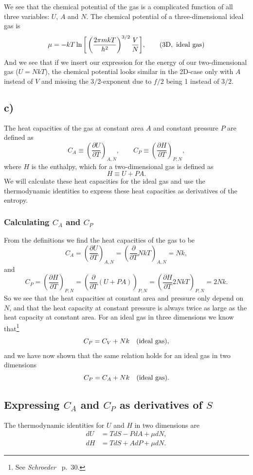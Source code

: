 \documentclass[a4paper, 11pt, titlepage, english]{article}
\begin{document}
We see that the chemical potential of the gas is a complicated function of all three variables: $U$, $A$ and $N$. The chemical potential of a three-dimensional ideal gas is
$$\mu = -kT \ln \bigg[\left(\frac{2\pi mkT}{h^2}\right)^{3/2}\frac{V}{N}\bigg], \qquad {\rm (3D,\ ideal\ gas)}$$
And we see that if we insert our expression for the energy of our two-dimensional gas ($U=NkT$), the chemical potential looks similar in the 2D-case only with $A$ instead of $V$ and missing the $3/2$-exponent due to $f/2$ being 1 instead of $3/2$.

\clearpage

\subsection*{c)}
The heat capacities of the gas at constant area $A$ and constant pressure $P$ are defined as
$$C_A \equiv \left( \frac{\partial U}{\partial T}\right)_{A,N}, \qquad C_P \equiv \left(\frac{\partial H}{\partial T}\right)_{P,N},$$
where $H$ is the enthalpy, which for a two-dimensional gas is defined as
$$H \equiv U + PA.$$
We will calculate these heat capacities for the ideal gas and use the thermodynamic identities to express these heat capacities as derivatives of the entropy.


\subsubsection*{Calculating $C_A$ and $C_P$}
From the definitions we find the heat capacities of the gas to be
$$C_A = \left( \frac{\partial U}{\partial T}\right)_{A,N} = \left( \frac{\partial }{\partial T} NkT\right)_{A,N} = Nk,$$
and
$$C_P = \left( \frac{\partial H}{\partial T} \right)_{P,N} = \left( \frac{\partial }{\partial T} (U + PA) \right)_{P,N} = \left( \frac{\partial H}{\partial T} 2NkT \right)_{P,N}  = 2Nk.$$
So we see that the heat capacities at constant area and pressure only depend on $N$, and that the heat capacity at constant pressure is always twice as large as the heat capacity at constant area.
For an ideal gas in three dimensions we know that\footnote{See {\it Schroeder\ } p.\ 30.}
$$C_P = C_V + Nk \quad {(\rm ideal\ gas)},$$
and we have now shown that the same relation holds for an ideal gas in two dimensions
$$C_P = C_A + Nk \quad {(\rm ideal\ gas)}.$$

\subsection*{Expressing $C_A$ and $C_P$ as derivatives of $S$}
The thermodynamic identities for $U$ and $H$ in two dimensions are
\begin{align}
dU &= TdS - PdA + \mu dN,\\
dH &= TdS + A dP + \mu dN.
\end{align}
\end{document}
